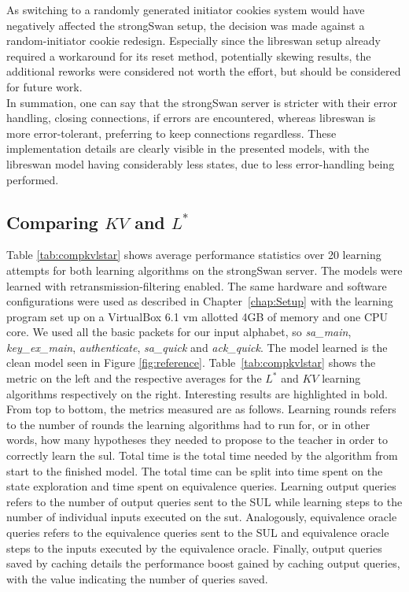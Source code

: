 As switching to a randomly generated initiator cookies system would have negatively affected the strongSwan setup, the decision was made against a random-initiator cookie redesign. Especially since the libreswan setup already required a workaround for its reset method, potentially skewing results, the additional reworks were considered not worth the effort, but should be considered for future work.\\

In summation, one can say that the strongSwan server is stricter with their error handling, closing connections, if errors are encountered, whereas libreswan is more error-tolerant, preferring to keep connections regardless. These implementation details are clearly visible in the presented models, with the libreswan model having considerably less states, due to less error-handling being performed.
\newpage

\subsection{Comparing $KV$ and $L^*$} \label{subsec:comp_kv_lstar}
Table \ref{tab:compkvlstar} shows average performance statistics over 20 learning attempts for both learning algorithms on the strongSwan server. The models were learned with retransmission-filtering enabled. The same hardware and software configurations were used as described in Chapter~\ref{chap:Setup} with the learning program set up on a VirtualBox 6.1 \ac{vm} allotted 4GB of memory and one CPU core. We used all the basic packets for our input alphabet, so
\emph{sa\_main}, \emph{key\_ex\_main}, \emph{authenticate}, \emph{sa\_quick} and \emph{ack\_quick}. The model learned is the clean model seen in Figure \ref{fig:reference}. Table~\ref{tab:compkvlstar} shows the metric on the left and the respective averages for the $L^*$ and $KV$ learning algorithms respectively on the right. Interesting results are highlighted in bold. From top to bottom, the metrics measured are as follows. Learning rounds refers to the number of rounds the learning algorithms had to run for, or in other words, how many hypotheses they needed to propose to the teacher in order to correctly learn the \ac{sul}. Total time is the total time needed by the algorithm from start to the finished model. The total time can be split into time spent on the state exploration and time spent on equivalence queries. Learning output queries refers to the number of output queries sent to the SUL while learning steps to the number of individual inputs executed on the \ac{sut}. Analogously, equivalence oracle queries refers to the equivalence queries sent to the SUL and equivalence oracle steps to the inputs executed by the equivalence oracle. Finally, output queries saved by caching details the performance boost gained by caching output queries, with the value indicating the number of queries saved.


